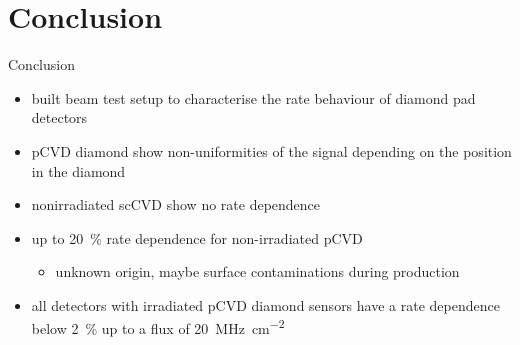 \section{Conclusion}
\begin{frame}{Conclusion}

	\begin{minipage}[c][.55\textheight]{\textwidth}
		\begin{itemize}
			\itemfill
			\item built beam test setup to characterise the rate behaviour of diamond pad detectors
			\item pCVD diamond show non-uniformities of the signal depending on the position in the diamond
			\item nonirradiated scCVD show no rate dependence
			\item up to \SI{20}{\%} rate dependence for non-irradiated pCVD
			\begin{itemize}
				\item unknown origin, maybe surface contaminations during production\vspace*{5pt}
			\end{itemize}

			\item all detectors with irradiated pCVD diamond sensors have a rate dependence below \SI{2}{\%} up to a flux of \SI{20}{\mega\hertz\per \centi\meter^2}
		\end{itemize}
	\end{minipage}
	
\end{frame}
